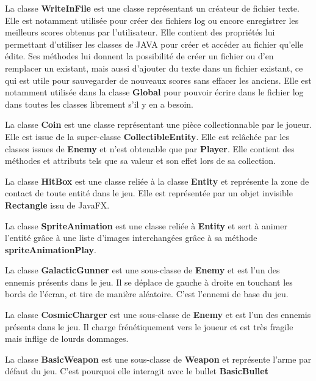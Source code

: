 \documentclass[12pt]{article}
\begin{document}
{La classe \textbf{WriteInFile} est une classe représentant un créateur de fichier texte. Elle est notamment utilisée pour créer des fichiers log ou encore enregistrer les meilleurs scores obtenus par l'utilisateur. Elle contient des propriétés lui permettant d'utiliser les classes de JAVA pour créer et accéder au fichier qu'elle édite. Ses méthodes lui donnent la possibilité de créer un fichier ou d'en remplacer un existant, mais aussi d'ajouter du texte dans un fichier existant, ce qui est utile pour sauvegarder de nouveaux scores sans effacer les anciens. Elle est notamment utilisée dans la classe \textbf{Global} pour pouvoir écrire dans le fichier log dans toutes les classes librement s'il y en a besoin.\newline

La classe \textbf{Coin} est une classe représentant une pièce collectionnable par le joueur. Elle est issue de la super-classe \textbf{CollectibleEntity}. Elle est relâchée par les classes issues de \textbf{Enemy} et n'est obtenable que par \textbf{Player}. Elle contient des méthodes et attributs tels que sa valeur et son effet lors de sa collection.\newline

La classe \textbf{HitBox} est une classe reliée à la classe \textbf{Entity} et représente la zone de contact de toute entité dans le jeu. Elle est représentée par un objet invisible \textbf{Rectangle} issu de JavaFX.\newline

La classe \textbf{SpriteAnimation} est une classe reliée à \textbf{Entity} et sert à animer l'entité grâce à une liste d'images interchangées grâce à sa méthode \textbf{spriteAnimationPlay}.\newline

La classe \textbf{GalacticGunner} est une sous-classe de \textbf{Enemy} et est l'un des ennemis présents dans le jeu. Il se déplace de gauche à droite en touchant les bords de l'écran, et tire de manière aléatoire. C'est l'ennemi de base du jeu.\newline \newline

La classe \textbf{CosmicCharger} est une sous-classe de \textbf{Enemy} et est l'un des ennemis présents dans le jeu. Il charge frénétiquement vers le joueur et est très fragile mais inflige de lourds dommages.\newline

La classe \textbf{BasicWeapon} est une sous-classe de \textbf{Weapon} et représente l'arme par défaut du jeu. C'est pourquoi elle interagit avec le bullet \textbf{BasicBullet} 

}
\end{document}
